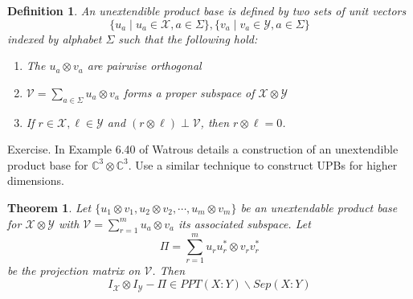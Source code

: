 \documentclass[12pt]{article}
\newcommand{\X}{\mathcal{X}}
\newcommand{\Y}{\mathcal{Y}}
\newtheorem{definition}{Definition}
\newtheorem{theorem}{Theorem}
\begin{document}
\begin{definition}
  An \emph{unextendible product base} is defined by two sets of unit vectors
  \[ \{u_a \mid  u_a \in \X, a \in \Sigma\}, \{v_a \mid v_a \in \Y, a \in \Sigma\} \]
  indexed by alphabet $\Sigma$ such that the following hold:
  \begin{enumerate}
    \item The $u_a \otimes v_a$ are pairwise orthogonal
    \item $\mathcal{V} = \sum_{a \in \Sigma} u_a \otimes v_a$ forms a \emph{proper} subspace of $\X \otimes \Y$
    \item If $r \in \X, \ell \in \Y$ and $(r \otimes \ell) \perp \mathcal{V}$, then $r \otimes \ell = 0$.
  \end{enumerate}
\end{definition}

\begin{tcolorbox}
  Exercise. In Example 6.40 of Watrous details a construction of an unextendible product base for $\mathbb{C}^3 \otimes \mathbb{C}^3$. Use a similar technique to construct UPBs for higher dimensions.
\end{tcolorbox}

\begin{theorem}
Let $\{u_1 \otimes v_1, u_2 \otimes v_2, \cdots, u_m \otimes v_m \}$ be an unextendable product base for $\X \otimes \Y$ with $\mathcal{V} = \sum_{r=1}^m u_a \otimes v_a$ its associated subspace. Let
\[
\Pi = \sum_{r=1}^m u_ru_r^* \otimes v_rv_r^*
\]
be the projection matrix on $\mathcal{V}$. Then
\[
I_{\X} \otimes I_{\Y} - \Pi \in PPT(X : Y) \backslash Sep(X:Y)
\]
\end{theorem}
\end{document}
